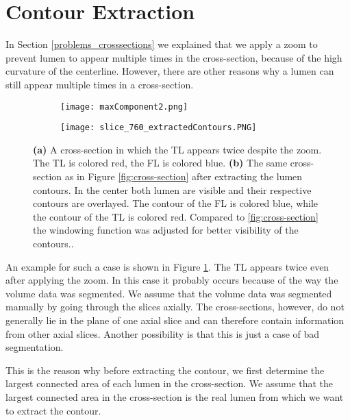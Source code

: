 \documentclass[thesis.tex]{subfiles}
\begin{document}
\section{Contour Extraction}
\label{section:extracting_contours}
In Section \ref{problems_crosssections} we explained that we apply a zoom to prevent lumen to appear multiple times in the cross-section, because of the high curvature of the centerline. However, there are other reasons why a lumen can still appear multiple times in a cross-section. 

\begin{figure}
\centering
	\begin{subfigure}[t]{0.454\textwidth}
		\texttt{[image: maxComponent2.png]}
		\caption{}	
		\label{maxComponent}	
	\end{subfigure}
\hspace{0.13\textwidth}
	\begin{subfigure}[t]{0.4\textwidth}
		\texttt{[image: slice\_760\_extractedContours.PNG]}
		
	\caption{}	
\label{fig:extracted_contours}	
	\end{subfigure}

	\caption{\textbf{(a)} A cross-section in which the TL appears twice despite the zoom. The TL is colored red, the FL is colored blue. \textbf{(b)} The same cross-section as in Figure \ref{fig:cross-section} after extracting the lumen contours. In the center both lumen are visible and their respective contours are overlayed. The contour of the FL is colored blue, while the contour of the TL is colored red. Compared to \ref{fig:cross-section} the windowing function was adjusted for better visibility of the contours..}
\label{fig:overlapping}
\end{figure}

An example for such a case is shown in Figure \ref{maxComponent}. The TL appears twice even after applying the zoom. In this case it probably occurs because of the way the volume data was segmented. We assume that the volume data was segmented manually by going through the slices axially. The cross-sections, however, do not generally lie in the plane of one axial slice and can therefore contain information from other axial slices. Another possibility is that this is just a case of bad segmentation.

This is the reason why before extracting the contour, we first determine the largest connected area of each lumen in the cross-section. We assume that the largest connected area in the cross-section is the real lumen from which we want to extract the contour. 
\end{document}
